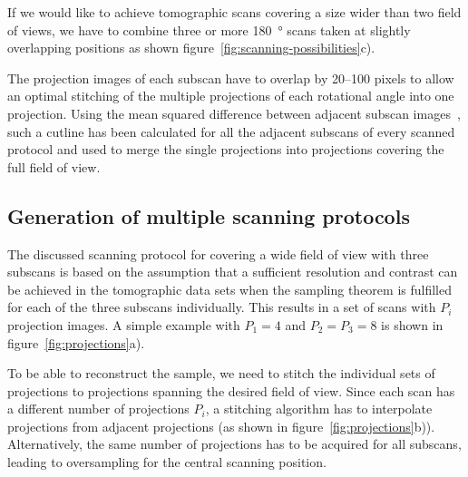 If we would like to achieve tomographic scans covering a size wider than two field of views, we have to combine three or more \SI{180}{\degree} scans taken at slightly overlapping positions as shown figure~\ref{fig:scanning-possibilities}c).

The projection images of each subscan have to overlap by 20--100 pixels to allow an optimal stitching of the multiple projections of each rotational angle into one projection. Using the mean squared difference between adjacent subscan images~\cite{Hintermueller2009}, such a cutline has been calculated for all the adjacent subscans of every scanned protocol and used to merge the single projections into projections covering the full field of view.

\subsection{Generation of multiple scanning protocols}%
The discussed scanning protocol for covering a wide field of view with three subscans is based on the assumption that a sufficient resolution and contrast can be achieved in the tomographic data sets when the sampling theorem is fulfilled for each of the three subscans individually. This results in a set of scans with $P_{i}$ projection images. A simple example with $P_{1}=4$ and $P_{2}=P_{3}=8$ is shown in figure~\ref{fig:projections}a).

To be able to reconstruct the sample, we need to stitch the individual sets of projections to projections spanning the desired field of view. Since each scan has a different number of projections $P_{i}$, a stitching algorithm has to interpolate projections from adjacent projections (as shown in figure~\ref{fig:projections}b)). Alternatively, the same number of projections has to be acquired for all subscans, leading to oversampling for the central scanning position.

